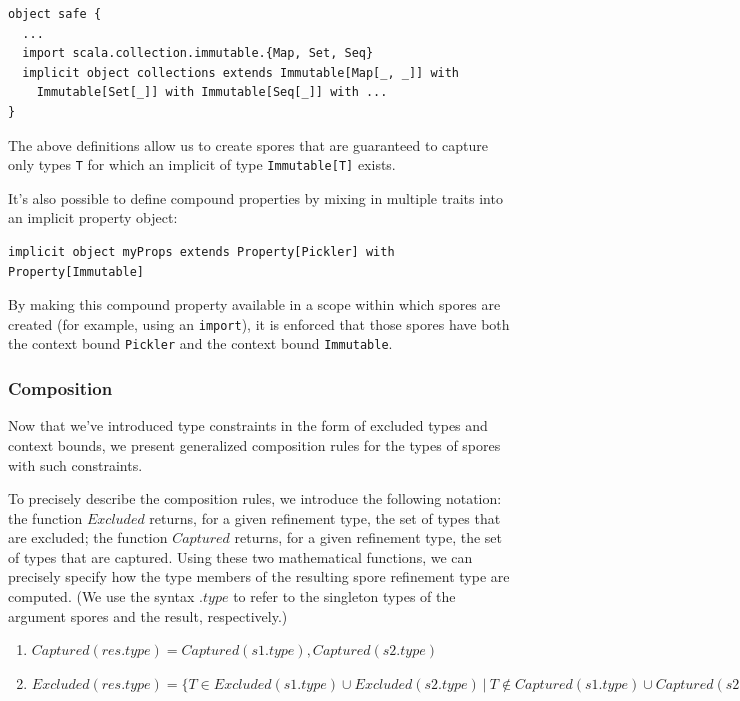 \documentclass{llncs}
\begin{document}
\begin{lstlisting}
object safe {
  ...
  import scala.collection.immutable.{Map, Set, Seq}
  implicit object collections extends Immutable[Map[_, _]] with
    Immutable[Set[_]] with Immutable[Seq[_]] with ...
}
\end{lstlisting}

\noindent
The above definitions allow us to create spores that are guaranteed to capture
only types \verb|T| for which an implicit of type \verb|Immutable[T]| exists.

It's also possible to define compound properties by mixing in multiple traits
into an implicit property object:

\begin{lstlisting}[numbers=none]
    implicit object myProps extends Property[Pickler] with Property[Immutable]
\end{lstlisting}

By making this compound property available in a scope within which spores are
created (for example, using an \verb|import|), it is enforced that those
spores have both the context bound \verb|Pickler| and the context bound
\verb|Immutable|.


\subsubsection{Composition}

Now that we've introduced type constraints in the form of excluded types and
context bounds, we present generalized composition rules for the types of
spores with such constraints.

To precisely describe the composition rules, we introduce the following
notation: the function $Excluded$ returns, for a given refinement type, the
set of types that are excluded; the function $Captured$ returns, for a given
refinement type, the set of types that are captured. Using these two
mathematical functions, we can precisely specify how the type members of the
resulting spore refinement type are computed. (We use the syntax $.type$
to refer to the singleton types of the argument spores and the result,
respectively.)

\begin{enumerate}

\item $Captured(res.type) = Captured(s1.type), Captured(s2.type)$

\item $Excluded(res.type) = \{ T \in Excluded(s1.type) \cup Excluded(s2.type) ~|~ T \notin Captured(s1.type) \cup Captured(s2.type) \}$

\end{enumerate}
\end{document}
